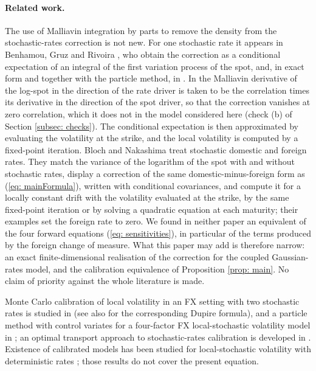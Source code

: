 \paragraph{Related work.} The use of Malliavin integration by parts to remove the density from the stochastic-rates correction is not new. For one stochastic rate it appears in Benhamou, Gruz and Rivoira \cite{benhamouGruzRivoira}, who obtain the correction as a conditional expectation of an integral of the first variation process of the spot, and, in exact form and together with the particle method, in \cite{guyonLabordere}. In \cite{benhamouGruzRivoira} the Malliavin derivative of the log-spot in the direction of the rate driver is taken to be the correlation times its derivative in the direction of the spot driver, so that the correction vanishes at zero correlation, which it does not in the model considered here (check (b) of Section \ref{subsec: checks}). The conditional expectation is then approximated by evaluating the volatility at the strike, and the local volatility is computed by a fixed-point iteration. Bloch and Nakashima \cite{blochNakashima} treat stochastic domestic and foreign rates. They match the variance of the logarithm of the spot with and without stochastic rates, display a correction of the same domestic-minus-foreign form as (\ref{eq: mainFormula}), written with conditional covariances, and compute it for a locally constant drift with the volatility evaluated at the strike, by the same fixed-point iteration or by solving a quadratic equation at each maturity; their examples set the foreign rate to zero. We found in neither paper an equivalent of the four forward equations (\ref{eq: sensitivities}), in particular of the terms produced by the foreign change of measure. What this paper may add is therefore narrow: an exact finite-dimensional realisation of the correction for the coupled Gaussian-rates model, and the calibration equivalence of Proposition \ref{prop: main}. No claim of priority against the whole literature is made.

Monte Carlo calibration of local volatility in an FX setting with two stochastic rates is studied in \cite{ogetbilGanesanHientzsch} (see also \cite{ogetbilHientzsch} for the corresponding Dupire formula), and a particle method with control variates for a four-factor FX local-stochastic volatility model in \cite{cozma}; an optimal transport approach to stochastic-rates calibration is developed in \cite{josephLoeperObloj}. Existence of calibrated models has been studied for local-stochastic volatility with deterministic rates \cite{abergelTachet,jourdainZhou,lackerShkolnikovZhang,djete,mustapha}; those results do not cover the present equation.

